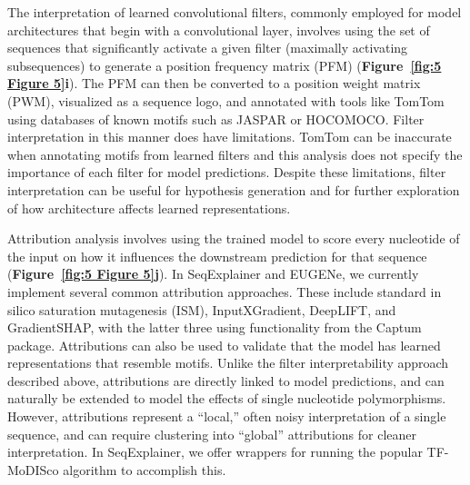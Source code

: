 The interpretation of learned convolutional filters, commonly employed for model architectures that begin with a convolutional layer, involves using the set of sequences that significantly activate a given filter (maximally activating subsequences) to generate a position frequency matrix (PFM) (\textbf{Figure~\ref{fig:5 Figure 5}\textbf{i}}). The PFM can then be converted to a position weight matrix (PWM), visualized as a sequence logo, and annotated with tools like TomTom\cite{Gupta2007-zw} using databases of known motifs such as JASPAR\cite{Castro-Mondragon2022-kx} or HOCOMOCO\cite{Kulakovskiy2018-oz}. Filter interpretation in this manner does have limitations. TomTom can be inaccurate when annotating motifs from learned filters\cite{Ullah2021-th,Koo2019-fb} and this analysis does not specify the importance of each filter for model predictions\cite{Koo2019-fb}. Despite these limitations, filter interpretation can be useful for hypothesis generation and for further exploration of how architecture affects learned representations\cite{Koo2019-fb,Koo2021-gs,Ploenzke2018-ng}.

Attribution analysis involves using the trained model to score every nucleotide of the input on how it influences the downstream prediction for that sequence (\textbf{Figure~\ref{fig:5 Figure 5}\textbf{j}}). In SeqExplainer and EUGENe, we currently implement several common attribution approaches. These include standard in silico saturation mutagenesis (ISM), InputXGradient\cite{Shrikumar2016-lf}, DeepLIFT\cite{Shrikumar2016-lf}, and GradientSHAP\cite{Lundberg2017-hh}, with the latter three using functionality from the Captum package\cite{Kokhlikyan2020-mv}. Attributions can also be used to validate that the model has learned representations that resemble motifs. Unlike the filter interpretability approach described above, attributions are directly linked to model predictions, and can naturally be extended to model the effects of single nucleotide polymorphisms. However, attributions represent a “local,” often noisy\cite{Han2022-pi,Majdandzic2022-eu} interpretation of a single sequence, and can require clustering into “global” attributions for cleaner interpretation. In SeqExplainer, we offer wrappers for running the popular TF-MoDISco algorithm\cite{Shrikumar2018-sb} to accomplish this.


